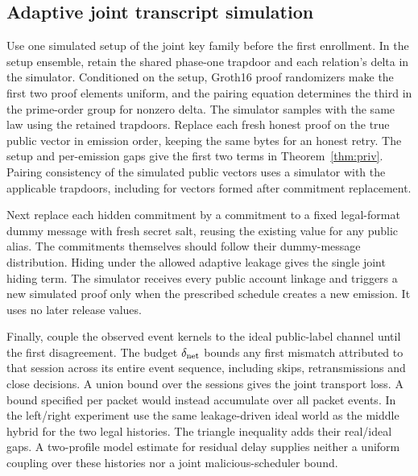 \subsection{Adaptive joint transcript simulation}
Use one simulated setup of the joint key family before the first enrollment. In the setup ensemble, retain the shared phase-one trapdoor and each relation's delta in the simulator. Conditioned on the setup, Groth16 proof randomizers make the first two proof elements uniform, and the pairing equation determines the third in the prime-order group for nonzero delta. The simulator samples with the same law using the retained trapdoors. Replace each fresh honest proof on the true public vector in emission order, keeping the same bytes for an honest retry. The setup and per-emission gaps give the first two terms in Theorem~\ref{thm:priv}. Pairing consistency of the simulated public vectors uses a simulator with the applicable trapdoors, including for vectors formed after commitment replacement.

Next replace each hidden commitment by a commitment to a fixed legal-format dummy message with fresh secret salt, reusing the existing value for any public alias. The commitments themselves should follow their dummy-message distribution. Hiding under the allowed adaptive leakage gives the single joint hiding term. The simulator receives every public account linkage and triggers a new simulated proof only when the prescribed schedule creates a new emission. It uses no later release values.

Finally, couple the observed event kernels to the ideal public-label channel until the first disagreement. The budget $\delta_{\rm net}$ bounds any first mismatch attributed to that session across its entire event sequence, including skips, retransmissions and close decisions. A union bound over the sessions gives the joint transport loss. A bound specified per packet would instead accumulate over all packet events. In the left/right experiment use the same leakage-driven ideal world as the middle hybrid for the two legal histories. The triangle inequality adds their real/ideal gaps. A two-profile model estimate for residual delay supplies neither a uniform coupling over these histories nor a joint malicious-scheduler bound.
